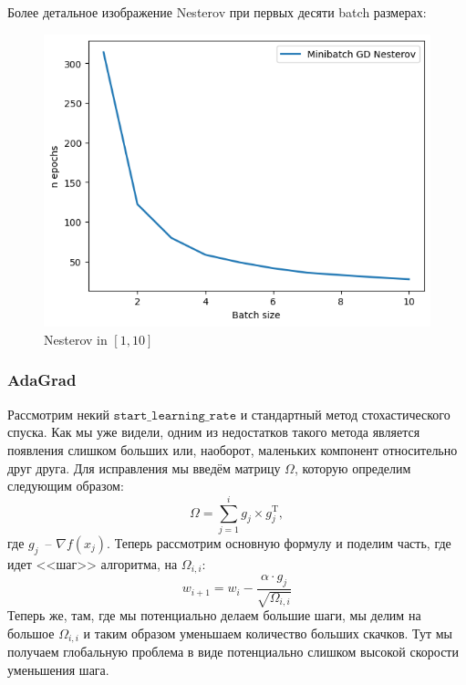 \documentclass[12pt, a4paper, oneside, final]{article}
\begin{document}
	Более детальное изображение Nesterov при первых десяти batch размерах:
	\begin{figure}[H]
		\centering
		\includegraphics[scale = 0.78]{Image/T3_NESTEROV_1_10.png}
		\caption*{Nesterov in $[1, 10]$}
	\end{figure}
	\subsubsection*{AdaGrad}
	Рассмотрим некий $\mathtt{start\_learning\_rate}$ и стандартный метод стохастического спуска.
	Как мы уже видели, одним из недостатков такого метода является появления слишком больших или, наоборот, маленьких компонент относительно друг друга.
	Для исправления мы введём матрицу $\Omega$, которую определим следующим образом:
	\[
		\Omega = \sum\limits_{j = 1}^{i}{g_{j} \times g_{j}^{\mathrm{T}}},
	\] где $g_{j}$~-- $\nabla{f(x_{j})}$.
	Теперь рассмотрим основную формулу и поделим часть, где идет <<шаг>> алгоритма, на $\Omega_{i, i}$:
	\[
		w_{i + 1} = w_{i} - \dfrac{\alpha \cdot g_{j}}{\sqrt{\Omega_{i, i}}}
	\]
	Теперь же, там, где мы потенциально делаем большие шаги, мы делим на большое $\Omega_{i, i}$ и таким образом уменьшаем количество больших скачков.
	Тут мы получаем глобальную проблема в виде потенциально слишком высокой скорости уменьшения шага.
\end{document}
